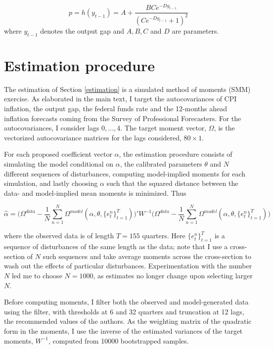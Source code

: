 \documentclass[11pt]{article}
\renewcommand{\[}{\begin{equation}}
\renewcommand{\]}{\end{equation}}
\begin{document}
\begin{equation}
 p = h(y_{t-1}) = A + \frac{B C e^{-D y_{t-1}}}{( C e^{-D y_{t-1}}+1)^2}
\end{equation}
where $y_{t-1}$ denotes the output gap and $A,B,C$ and $D$ are parameters.

\section{Estimation procedure}\label{SMM}
The estimation of Section \ref{estimation} is a simulated method of moments (SMM) exercise. As elaborated in the main text, I target the autocovariances of CPI inflation, the output gap, the federal funds rate and the 12-months ahead inflation forecasts coming from the Survey of Professional Forecasters. For the autocovariances, I consider lags $0, \dots, 4$. The target moment vector, $\Omega$, is the vectorized autocovariance matrices for the lags considered, $80\times1$. 

For each proposed coefficient vector $\alpha$, the estimation procedure consists of simulating the model conditional on $\alpha$, the calibrated parameters $\theta$ and $N$ different sequences of disturbances, computing model-implied moments for each simulation, and lastly choosing $\alpha$ such that the squared distance between the data- and model-implied mean moments is minimized. Thus

\begin{equation}
\hat{\alpha} = \bigg(\Omega^{data}-\frac{1}{N}\sum_{n=1}^N\Omega^{model}(\alpha, \theta, \{e^n_t\}_{t=1}^{T})\bigg)' W^{-1} \bigg(\Omega^{data}-\frac{1}{N}\sum_{n=1}^N\Omega^{model}(\alpha, \theta,  \{e^n_t\}_{t=1}^{T})\bigg)
\end{equation}

where the observed data is of length $T=155$ quarters. Here $\{e^n_t\}_{t=1}^{T}$ is a sequence of disturbances of the same length as the data; note that I use a cross-section of $N$ such sequences and take average moments across the cross-section to wash out the effects of particular disturbances. Experimentation with the number $N$ led me to choose $N=1000$, as estimates no longer change upon selecting larger $N$.

Before computing moments, I filter both the observed and model-generated data using the \cite{baxter1999measuring} filter, with thresholds at 6 and 32 quarters and truncation at 12 lags, the recommended values of the authors. As the weighting matrix of the quadratic form in the moments, I use the inverse of the estimated variances of the target moments, $W^{-1}$, computed from 10000 bootstrapped samples.  
\end{document}
